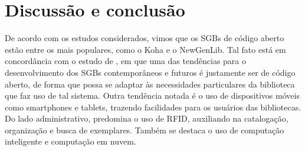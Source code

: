\documentclass[12pt]{article}
\begin{document}
\section{Discussão e conclusão}
De acordo com os estudos considerados, vimos que os SGBs de código aberto estão entre os mais populares, como o Koha e o NewGenLib. Tal fato está em concordância com o estudo de \cite{7603363}, em que uma das tendências para o desenvolvimento dos SGBs contemporâneos e futuros é justamente ser de código aberto, de forma que possa se adaptar às necessidades particulares da biblioteca que faz uso de tal sistema. Outra tendência notada é o uso de dispositivos móveis como smartphones e tablets, trazendo facilidades para os usuários das bibliotecas. Do lado administrativo, predomina o uso de RFID, auxiliando na catalogação, organização e busca de exemplares. Também se destaca o uso de computação inteligente e computação em nuvem.



\end{document}
